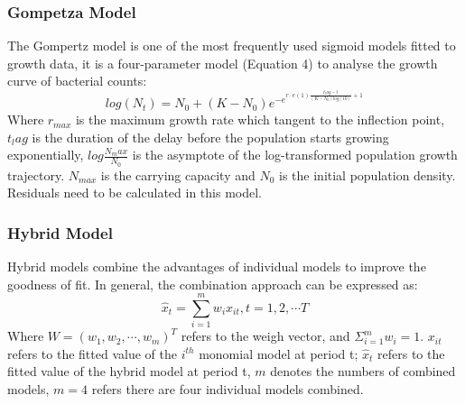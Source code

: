 \documentclass[a4paper]{report}
\begin{document}
\begin{linenumbers}
         \subsubsection{Gompetza Model}
        The Gompertz model is one of the most frequently used sigmoid models fitted to growth data, it is a four-parameter model (Equation 4) to analyse the growth curve of bacterial counts:
        \begin{equation}
                log(N_t) = N_0 + (K - N_0) e^{-e^{r \cdot e(1) \frac{t_lag - t}{(K - N_0) log(10)}+1}}
                \label{eq:gompertz}
        \end{equation}
        Where $r_{max}$ is the maximum growth rate which tangent to the inflection point, $t_lag$ is the duration of the delay before the population starts growing exponentially, $log\frac{N_max}{N_0} $ is the asymptote of the log-transformed population growth trajectory. $N_{max}$ is the carrying capacity and $N_0$ is the initial population density. Residuals need to be calculated in this model.

        \subsubsection{Hybrid Model}
        Hybrid  models combine the advantages of individual models to improve the goodness of fit. In general, the combination approach can be expressed as:
        \begin{equation}
                \hat{x}_t=\sum_{i=1}^m{w_i}x_{it},t=1,2,\cdots T
                \label{eq:Hybrid}
        \end{equation}
        Where $W=\left( w_1,w_2,\cdots ,w_m \right) ^T$ refers to the weigh vector, and $\varSigma_{i=1}^{m}w_i=1$. $x_{it}$ refers to the fitted value of the $i^{th}$ monomial model at period t; $\hat{x}_t$ refers to the fitted value of the hybrid model at period t, $m$ denotes the numbers of combined models, $m = 4$ refers there are four individual models combined.
                

\end{linenumbers}
\end{document}
